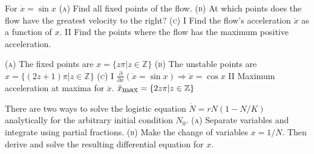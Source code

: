 \documentclass[11pt,answers]{exam}
\begin{document}
\begin{questions}

\addtocounter{question}{22}

\item For $\dot{x} = \sin{x}$
\newline\textsc{(a)} Find all fixed points of the flow.
\newline\textsc{(b)} At which points does the flow have the greatest velocity to the right?
\newline\textsc{(c)} \textrm{I} Find the flow's acceleration $\ddot{x}$ as a function of $x$.
\newline \hspace*{1.1em} \textrm{II} Find the points where the flow has the maximum positive acceleration.

\begin{solution}
\newline\textsc{(a)} The fixed points are $x = \{z\pi | z \in \mathbb{Z}\}$
\newline\newline\textsc{(b)} The unstable points are $x = \{(2z + 1)\pi | z\in \mathbb{Z}\}$
\newline\newline\textsc{(c)} \textrm{I} \hspace{3em} $\displaystyle \frac{\partial}{\partial{x}}\left(\dot{x} = \sin{x} \right) \Rightarrow \ddot{x} = \cos{x}$
\newline \hspace*{1.1em} \textrm{II} \hspace{3em} Maximum acceleration at maxima for $\ddot{x}$.  $\ddot{x}_{\hbox{max}} = \{2z\pi | z \in \mathbb{Z}\}$
\end{solution}


\item There are two ways to solve the logistic equation $\dot{N} = rN(1 - N/K)$ analytically for the arbitrary initial condition $N_0$.
\newline\textsc{(a)} Separate variables and integrate using partial fractions.
\newline\textsc{(b)} Make the change of variables $x = 1/N$.  Then derive and solve the resulting differential equation for $x$.


\end{questions}
\end{document}
